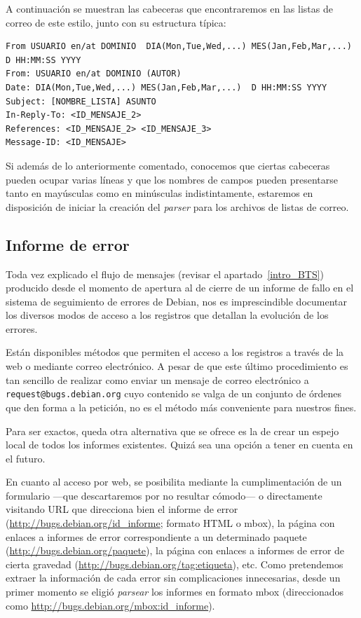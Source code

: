 A continuación se muestran las cabeceras que encontraremos en las listas de
correo de este estilo, junto con su estructura típica:

{\scriptsize
\begin{verbatim}
From USUARIO en/at DOMINIO  DIA(Mon,Tue,Wed,...) MES(Jan,Feb,Mar,...)  D HH:MM:SS YYYY
From: USUARIO en/at DOMINIO (AUTOR)
Date: DIA(Mon,Tue,Wed,...) MES(Jan,Feb,Mar,...)  D HH:MM:SS YYYY
Subject: [NOMBRE_LISTA] ASUNTO
In-Reply-To: <ID_MENSAJE_2>
References: <ID_MENSAJE_2> <ID_MENSAJE_3>
Message-ID: <ID_MENSAJE>

\end{verbatim}
}

Si además de lo anteriormente comentado, conocemos que ciertas cabeceras pueden
ocupar varias líneas y que los nombres de campos pueden presentarse tanto en
mayúsculas como en minúsculas indistintamente, estaremos en disposición de iniciar
la creación del \textit{parser} para los archivos de listas de correo.


\subsection{Informe de error}
Toda vez explicado el flujo de mensajes (revisar el apartado~\ref{intro_BTS})
producido desde el momento de apertura al de cierre de un informe de fallo en el
sistema de seguimiento de errores de Debian, nos es imprescindible documentar
los diversos modos de acceso a los registros que detallan la evolución de los
errores.

Están disponibles métodos que permiten el acceso a los registros a
través de la web o mediante correo electrónico. A pesar de que este último
procedimiento es tan sencillo de realizar como enviar un mensaje de correo
electrónico a \texttt{request@bugs.debian.org} cuyo contenido se valga de un
conjunto de órdenes que den forma a la petición, no es el método más
conveniente para nuestros fines.

Para ser exactos, queda otra alternativa que se ofrece es la de crear un
espejo local de todos los informes existentes. Quizá sea una opción a tener
en cuenta en el futuro.

En cuanto al acceso por web, se posibilita mediante la cumplimentación de un
formulario ---que descartaremos por no resultar cómodo--- o directamente
visitando URL que direcciona bien el informe de error
(\url{http://bugs.debian.org/id_informe}; formato HTML o mbox),
la página con enlaces a informes de error correspondiente a un determinado
paquete (\url{http://bugs.debian.org/paquete}),
la página con enlaces a informes de error de cierta gravedad
(\url{http://bugs.debian.org/tag:etiqueta}), etc.
Como pretendemos extraer la información de cada error sin complicaciones
innecesarias, desde un primer momento se eligió \textit{parsear} los informes
en formato mbox (direccionados como \url{http://bugs.debian.org/mbox:id_informe}).

